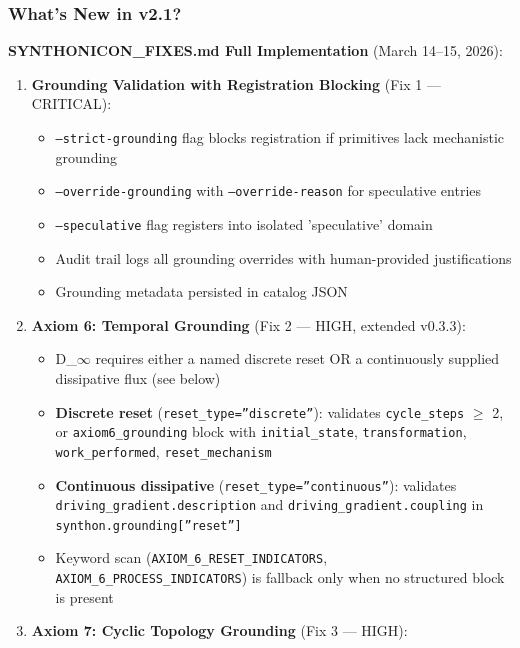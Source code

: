 \documentclass[12pt,a4paper]{article}
\begin{document}
\subsubsection{What's New in v2.1?}

\textbf{SYNTHONICON\_FIXES.md Full Implementation} (March 14--15, 2026):

\begin{enumerate}
    \item 
    \textbf{Grounding Validation with Registration Blocking} (Fix 1 --- CRITICAL):

    \begin{itemize}
    \item \texttt{--strict-grounding} flag blocks registration if primitives lack mechanistic grounding
    \item \texttt{--override-grounding} with \texttt{--override-reason} for speculative entries
    \item \texttt{--speculative} flag registers into isolated 'speculative' domain
    \item Audit trail logs all grounding overrides with human-provided justifications
    \item Grounding metadata persisted in catalog JSON
\end{itemize}

    \item 
    \textbf{Axiom 6: Temporal Grounding} (Fix 2 --- HIGH, extended v0.3.3):

    \begin{itemize}
    \item D\_$\infty$ requires either a named discrete reset OR a continuously supplied dissipative flux (see below)
    \item \textbf{Discrete reset} (\texttt{reset\_type=''discrete''}): validates \texttt{cycle\_steps} $\geq$ 2, or \texttt{axiom6\_grounding} block with \texttt{initial\_state}, \texttt{transformation}, \texttt{work\_performed}, \texttt{reset\_mechanism}
    \item \textbf{Continuous dissipative} (\texttt{reset\_type=''continuous''}): validates \texttt{driving\_gradient.description} and \texttt{driving\_gradient.coupling} in \texttt{synthon.grounding{[}''reset''{]}}
    \item Keyword scan (\texttt{AXIOM\_6\_RESET\_INDICATORS}, \texttt{AXIOM\_6\_PROCESS\_INDICATORS}) is fallback only when no structured block is present
\end{itemize}

    \item 
    \textbf{Axiom 7: Cyclic Topology Grounding} (Fix 3 --- HIGH):


\end{enumerate}
\end{document}
